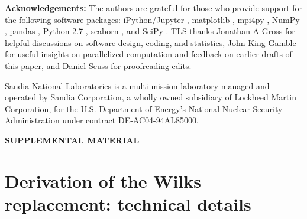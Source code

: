\documentclass[aps,pra, twocolumn]{revtex4}
\begin{document}
\noindent\textbf{Acknowledgements:} The authors are grateful for those who provide support for the following software packages: iPython/Jupyter \cite{Perez}, matplotlib
\cite{Hunter2007}, mpi4py \cite{Dalcin2005},  NumPy \cite{VanDerWalt2011}, pandas \cite{mckinney2010}, Python 2.7 
\cite{vanRossum}, seaborn \cite{Waskom2016}, and SciPy \cite{Oliphant2007a}. TLS thanks Jonathan A Gross for helpful 
discussions on software design, coding, and statistics, John King Gamble for useful insights on parallelized 
computation and feedback on earlier drafts of this paper, and Daniel Seuss for proofreading edits.

Sandia National Laboratories is a multi-mission laboratory managed and operated by Sandia Corporation, a wholly owned 
subsidiary of Lockheed Martin Corporation, for the U.S. Department of Energy's National Nuclear Security Administration 
under contract DE-AC04-94AL85000.




\newpage
\newpage

\begin{center}\textbf{SUPPLEMENTAL MATERIAL}\end{center}

\section{Derivation of the Wilks replacement: technical details}
\label{app:technical}
\end{document}
